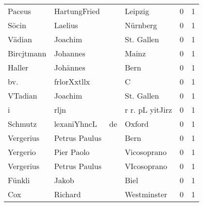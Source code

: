 \begin{center}
\begin{tiny}
\begin{longtabu}{llllrr}
                   Paceus &                       HartungFried &             &                                     Leipzig &          0 &         1 \\
                    Söcin &                            Laelius &             &                                    Nürnberg &          0 &         1 \\
                   Vädian &                            Joachim &             &                                  St. Gallen &          0 &         1 \\
               Bircjtmann &                           Johannes &             &                                       Mainz &          0 &         1 \\
                   Haller &                           Johännes &             &                                        Bern &          0 &         1 \\
                      bv. &                        frlorXxtllx &             &                                           C &          0 &         1 \\
                  VTadian &                            Joachim &             &                                  St. Gallen &          0 &         1 \\
                        i &                               rljn &             &                             r r. pL yitJirz &          0 &         1 \\
                  Schmutz &                        lexaniYhncL &          de &                                      Oxford &          0 &         1 \\
                Vergerius &                      Petrus Paulus &             &                                        Bern &          0 &         1 \\
                 Yergerio &                         Pier Paolo &             &                                 Vicosoprano &          0 &         1 \\
                Vergerius &                      Petrus Paulus &             &                                 VIcosoprano &          0 &         1 \\
                   Fünkli &                              Jakob &             &                                        Biel &          0 &         1 \\
                      Cox &                            Richard &             &                                 Westminster &          0 &         1 \\

\end{longtabu}
\end{tiny}
\end{center}
